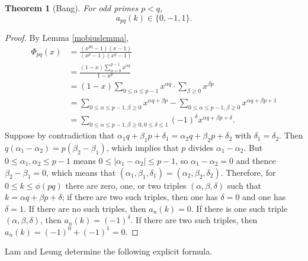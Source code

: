 \documentclass{amsart}
\newtheorem{theorem}{Theorem}
\theoremstyle{definition}
\begin{document}
\begin{theorem}[Bang]
For odd primes $p<q$,
\[
a_{pq}(k) \in \{0,-1,1\}.
\] 
\end{theorem}
\begin{proof}
By Lemma \ref{mobiuslemma},
\begin{align*}
\Phi_{pq}(x)&=\frac{(x^{pq}-1)(x-1)}{(x^p-1)(x^q-1)}\\
&=\frac{(1-x)\sum_{\alpha=0}^{p-1} x^{\alpha q}}{1-x^p}\\
&=(1-x) \sum_{0 \leq \alpha \leq p-1}  x^{\alpha q} \cdot \sum_{\beta \geq 0} x^{\beta p}\\
&=\sum_{0 \leq \alpha \leq p-1, \beta \geq 0} x^{\alpha q+\beta p}
-\sum_{0 \leq \alpha \leq p-1, \beta \geq 0} x^{\alpha q+\beta p+1}\\
&=\sum_{0 \leq \alpha \leq p-1, \beta \geq 0, 0 \leq \delta \leq 1} (-1)^\delta x^{\alpha q+\beta p+\delta}.
\end{align*}
Suppose by contradiction that $\alpha_1 q+\beta_1 p + \delta_1 = 
\alpha_2 q +\beta_2 p +\delta_2$ with $\delta_1=\delta_2$. Then 
$q(\alpha_1-\alpha_2) = p(\beta_2-\beta_1)$, which implies that $p$ divides $\alpha_1-\alpha_2$. But
$0 \leq \alpha_1,\alpha_2 \leq p-1$ means $0 \leq |\alpha_1-\alpha_2| \leq p-1$, so $\alpha_1-\alpha_2=0$ and thence
$\beta_2-\beta_1=0$, which means that $(\alpha_1,\beta_1,\delta_1)=(\alpha_2,\beta_2,\delta_2)$. 
Therefore, for $0 \leq k \leq \phi(pq)$ there are zero, one, or two triples $(\alpha,\beta,\delta)$ such that
$k=\alpha q + \beta p + \delta$; if there are two such triples, then one has $\delta=0$ and one has $\delta=1$.
If there are no such triples, then $a_n(k)=0$. If there is one such triple $(\alpha,\beta,\delta)$, then $a_n(k)=(-1)^\delta$.
If there are two such triples, then $a_n(k) = (-1)^0+(-1)^1 = 0$. 
\end{proof}


Lam and Leung \cite{lam1996} determine the following explicit formula.
\end{document}
